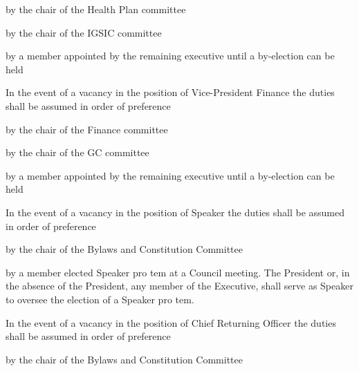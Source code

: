 \begin{longenum}[ label*=\thesubsection.\arabic*., align=left]
\begin{longenum}[ label*=\arabic*., align=left]
\begin{longenum}[ label*=\arabic*., align=left]
				\item by the chair of the Health Plan committee
				\item by the chair of the IGSIC committee
				\item by a member appointed by the remaining executive until a by-election can be held
			\end{longenum}
			\item In the event of a vacancy in the position of Vice-President Finance the duties shall be assumed in order of preference
			\begin{longenum}[ label*=\arabic*., align=left]
				\item by the chair of the Finance committee
				\item by the chair of the GC committee
				\item by a member appointed by the remaining executive until a by-election can be held
			\end{longenum}
			\item In the event of a vacancy in the position of Speaker the duties shall be assumed in order of preference
			\begin{longenum}[ label*=\arabic*., align=left]
				\item by the chair of the Bylaws and Constitution Committee
				\item by a member elected Speaker pro tem at a Council meeting. The President or, in the absence of the President, any member of the Executive, shall serve as Speaker to oversee the election of a Speaker pro tem.
			\end{longenum}
			\item In the event of a vacancy in the position of Chief Returning Officer the duties shall be assumed in order of preference
			\begin{longenum}[ label*=\arabic*., align=left]
				\item by the chair of the Bylaws and Constitution Committee

\end{longenum}
\end{longenum}
\end{longenum}

